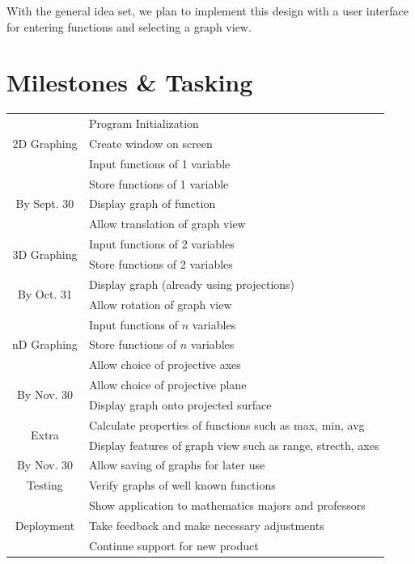 \documentclass{article}
\newlength{\headerwidth}
\begin{document}
{With the general idea set, we plan to implement this design with a 
user interface for entering functions and selecting a graph view.

\newpage
\section{Milestones \& Tasking}
\begin{tabularx}{\headerwidth}{|c|X|} 
	\hline
	\multirow{3}{*}{ 2D Graphing } & Program Initialization \\
								   & Create window on screen \\
								   & Input functions of 1 variable \\
	\multirow{3}{*}{ By Sept. 30 } & Store functions of 1 variable \\
								   & Display graph of function \\
								   & Allow translation of graph view \\
	\hline
	\multirow{2}{*}{ 3D Graphing } & Input functions of 2 variables \\
								   & Store functions of 2 variables \\
	\multirow{2}{*}{ By Oct. 31 }  & Display graph (already using projections) \\
								   & Allow rotation of graph view \\ 
	\hline
	\multirow{3}{*}{ nD Graphing } & Input functions of $n$ variables \\
								   & Store functions of $n$ variables \\
								   & Allow choice of projective axes \\
	\multirow{2}{*}{ By Nov. 30 }  & Allow choice of projective plane \\
								   & Display graph onto projected surface \\
	\hline
	\multirow{2}{*}{ Extra } & Calculate properties of functions such as max, min, avg \\
	                         & Display features of graph view such as range, strecth, axes \\
	By Nov. 30				 & Allow saving of graphs for later use \\
	\hline
	Testing & Verify graphs of well known functions \\
	\hline
	\multirow{3}{*}{ Deployment } & Show application to mathematics majors and professors \\
								  & Take feedback and make necessary adjustments \\
								  & Continue support for new product \\
	\hline
\end{tabularx}

}
\end{document}
